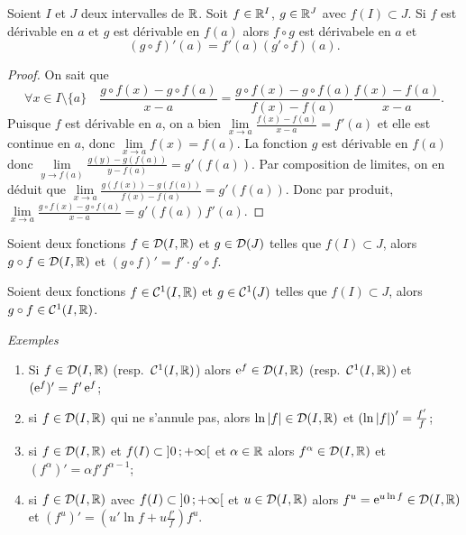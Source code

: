 \begin{theo}
  Soient \(I\) et \(J\) deux intervalles de \(\mathbb{R}\). Soit \(f \in \mathbb{R}^I\), \(g \in \mathbb{R}^J\) avec \(f(I) \subset J\). Si \(f\) est dérivable en \(a\) et \(g\) est dérivable en \(f(a)\) alors \(f \circ g\) est dérivabele en \(a\) et
  \begin{equation}
    (g \circ f)'(a)=f'(a) (g' \circ f)(a).
  \end{equation}
\end{theo}
\begin{proof}
  On sait que
  \begin{equation}
    \forall x \in I\setminus\{a\} \quad \frac{g \circ f(x) -g \circ f(a)}{x-a} = \frac{g \circ f(x) -g \circ f(a)}{f(x)-f(a)} \frac{f(x)-f(a)}{x-a}.
  \end{equation}
  Puisque \(f\) est dérivable en \(a\), on a bien \(\lim\limits_{x \to a} \frac{f(x)-f(a)}{x-a} = f'(a)\) et elle est continue en \(a\), donc \(\lim\limits_{x \to a} f(x)=f(a)\). La fonction \(g\) est dérivable en \(f(a)\) donc \(\lim\limits_{y \to f(a)} \frac{g(y)-g(f(a))}{y-f(a)} = g'(f(a))\). Par composition de limites, on en déduit que \(\lim\limits_{x \to a} \frac{g(f(x))-g(f(a))}{f(x)-f(a)} = g'(f(a))\). Donc par produit, \(\lim\limits_{x \to a} \frac{g \circ f(x) -g \circ f(a)}{x-a} = g'(f(a)) f'(a)\).
\end{proof}
\begin{corth}
  Soient deux fonctions \(f \in \mathcal{D}(I,\mathbb{R})\) et \(g \in \mathcal{D}(J)\) telles que \(f(I) \subset J\), alors \(g \circ f \in \mathcal{D}(I,\mathbb{R})\) et \((g\circ f)'=f' \cdot g' \circ f\).
\end{corth}
\begin{corth}
  Soient deux fonctions \(f \in \mathcal{C}^{1}(I,\mathbb{R})\) et \(g \in \mathcal{C}^{1}(J)\) telles que \(f(I) \subset J\), alors \(g \circ f \in \mathcal{C}^{1}(I,\mathbb{R})\).
\end{corth}

\emph{Exemples}

\begin{enumerate}
\item Si \(f \in \mathcal{D}(I,\mathbb{R})\) (resp.\ \(\mathcal{C}^{1}(I,\mathbb{R})\)) alors \(\operatorname{e}^f \in \mathcal{D}(I,\mathbb{R})\) (resp.\ \(\mathcal{C}^{1}(I,\mathbb{R})\)) et \((\operatorname{e}^f)'=f' \operatorname{e}^f\);
\item si \(f \in \mathcal{D}(I,\mathbb{R})\) qui ne s'annule pas, alors \(\ln \left\lvert f\right\rvert \in \mathcal{D}(I,\mathbb{R})\) et \(\left(\ln\left\lvert f\right\rvert \right)'=\frac{f'}{f}\);
\item si \(f \in \mathcal{D}(I,\mathbb{R})\) et \(f(I) \subset \left] 0 \, ;  +\infty \right[\) et \(\alpha \in \mathbb{R}\) alors \(f^\alpha \in \mathcal{D}(I,\mathbb{R})\) et \((f^\alpha)'=\alpha f' f^{\alpha-1}\);
\item si \(f \in \mathcal{D}(I,\mathbb{R})\) avec \(f(I) \subset \left] 0 \, ;  +\infty \right[\) et \(u \in \mathcal{D}(I,\mathbb{R})\) alors \(f^u=\operatorname{e}^{u \ln f} \in \mathcal{D}(I,\mathbb{R})\) et \((f^u)'=\left(u'\ln f+u \frac{f'}{f}\right) f^u\).
\end{enumerate}

